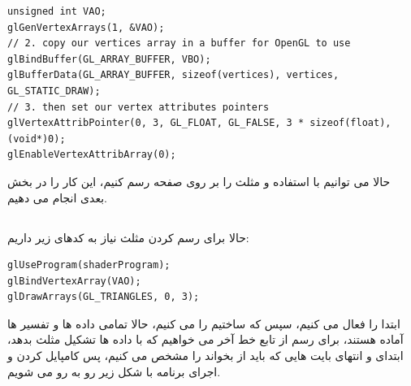 \documentclass[a4paper, 12pt]{book}
\newcommand{\lrit}[1]{\lr{\textit{#1}}}
\begin{document}
    \begin{LTR}
    \small
        \begin{lstlisting}[style=C++Style,caption=\lrit{link vertex attribute to vertex data}]
unsigned int VAO;
glGenVertexArrays(1, &VAO);
// 2. copy our vertices array in a buffer for OpenGL to use
glBindBuffer(GL_ARRAY_BUFFER, VBO);
glBufferData(GL_ARRAY_BUFFER, sizeof(vertices), vertices, GL_STATIC_DRAW);
// 3. then set our vertex attributes pointers
glVertexAttribPointer(0, 3, GL_FLOAT, GL_FALSE, 3 * sizeof(float), (void*)0);
glEnableVertexAttribArray(0);

        \end{lstlisting}
    \end{LTR}
    \normalsize
    \vspace*{0.3cm}


    حالا می توانیم با استفاده  و  مثلث را بر روی صفحه رسم کنیم، این کار را در بخش بعدی انجام می دهیم.

\newpage
\subsection*{}
\noindent
\normalsize
    حالا برای رسم کردن مثلث نیاز به کدهای زیر داریم:

    \begin{LTR}
    \small
        \begin{lstlisting}[style=C++Style,caption=\lrit{link vertex attribute to vertex data}]
glUseProgram(shaderProgram);
glBindVertexArray(VAO);
glDrawArrays(GL_TRIANGLES, 0, 3);
        \end{lstlisting}
    \end{LTR}
    \normalsize
    \vspace*{0.3cm}

    ابتدا  را فعال می کنیم، سپس  که ساختیم را  می کنیم، حالا تمامی داده ها و تفسیر ها آماده هستند، برای رسم از تابع خط آخر می خواهیم که با داده ها تشکیل مثلث بدهد، ابتدای و انتهای بایت هایی که باید از  بخواند را مشخص می کنیم، پس کامپایل کردن و اجرای برنامه با شکل زیر رو به رو می شویم.
\end{document}
